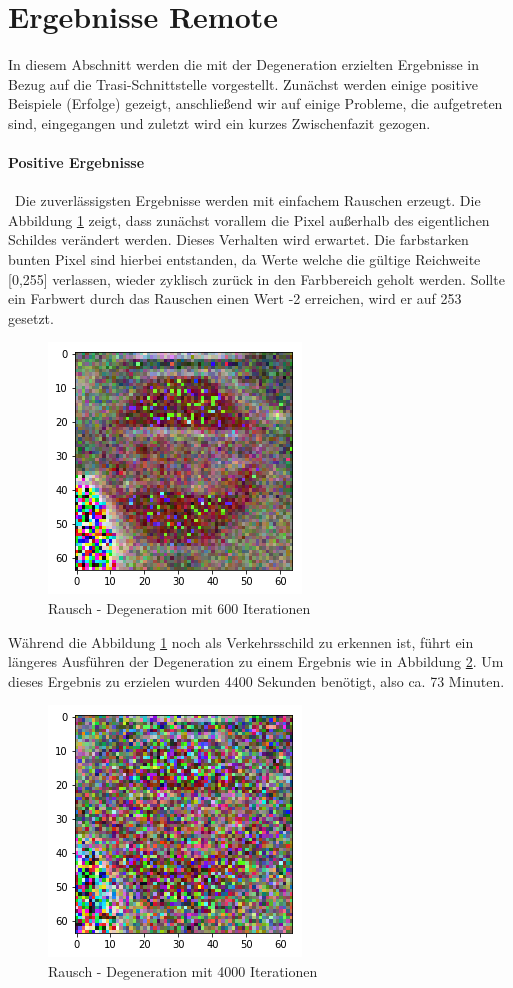 \section{Ergebnisse Remote}
\label{sec:DegenerationErgebnisse}
In diesem Abschnitt werden die mit der Degeneration erzielten Ergebnisse in Bezug auf die Trasi-Schnittstelle vorgestellt. Zunächst werden einige positive Beispiele (Erfolge) gezeigt, anschließend wir auf einige Probleme, die aufgetreten sind, eingegangen und zuletzt wird ein kurzes Zwischenfazit gezogen. 
\paragraph{Positive Ergebnisse} ~\newline Die zuverlässigsten Ergebnisse werden mit einfachem Rauschen erzeugt. Die Abbildung \ref{fig:stoptiefe600} zeigt, dass zunächst vorallem die Pixel außerhalb des eigentlichen Schildes verändert werden. Dieses Verhalten wird erwartet. Die farbstarken bunten Pixel sind hierbei entstanden, da Werte welche die gültige Reichweite [0,255] verlassen, wieder zyklisch zurück in den Farbbereich geholt werden. Sollte ein Farbwert durch das Rauschen einen Wert -2 erreichen, wird er auf 253 gesetzt.  

\begin{figure}[h]
	\centering
	\includegraphics[width=0.4\linewidth]{Images/DegenSamples/StopTiefe600}
	\caption[Degeneration Tiefe 600]{Rausch - Degeneration mit 600 Iterationen}
	\label{fig:stoptiefe600}
\end{figure}

Während die Abbildung \ref{fig:stoptiefe600} noch als Verkehrsschild zu erkennen ist, führt ein längeres Ausführen der Degeneration zu einem Ergebnis wie in Abbildung \ref{fig:stoptiefe4000}. Um dieses Ergebnis zu erzielen wurden 4400 Sekunden benötigt, also ca. 73 Minuten.

\begin{figure}[h]
	\centering
	\includegraphics[width=0.4\linewidth]{Images/DegenSamples/StopTiefe4000}
	\caption[Degeneration Tiefe 4000]{Rausch - Degeneration mit 4000 Iterationen}
	\label{fig:stoptiefe4000}
\end{figure}

